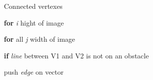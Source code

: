 \documentclass[../Head/Main.tex]{subfiles}
\begin{document}
\begin{Pseudo}{Connected vertexes}{}

 	\textbf{for} \textit{i} hight of image 
	\begin{Indentation}
		\item 
	\begin{Indentation}
	\item \textbf{for} all \textit{j} width of image 
	\item \textbf{if} \textit{line} between V1 and V2 is not on an obstacle   	
	\item push \textit{edge} on vector

	\end{Indentation}
	
	\end{Indentation}

	
\end{Pseudo} 
\end{document}
